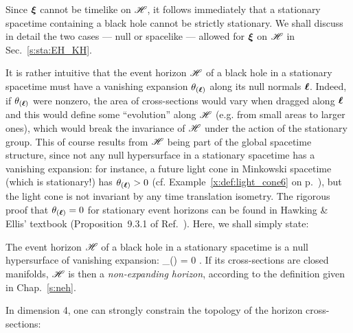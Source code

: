 Since $\bm{\xi}$ cannot be timelike on $\mathscr{H}$, it follows immediately
that a stationary spacetime containing a black hole cannot be strictly stationary.
We shall discuss in detail the two cases --- null or spacelike --- allowed
for $\bm{\xi}$ on $\mathscr{H}$ in Sec.~\ref{s:sta:EH_KH}.

It is rather intuitive that the event horizon $\mathscr{H}$ of a black hole in
a stationary spacetime must have a vanishing expansion $\theta_{(\bm{\ell})}$ along its null
normals $\bm{\ell}$. Indeed, if $\theta_{(\bm{\ell})}$ were nonzero,
the area of cross-sections would vary when dragged
along $\bm{\ell}$ and this would define some ``evolution'' along $\mathscr{H}$ (e.g. from small areas
to larger ones),
which would break the invariance of $\mathscr{H}$ under the action of the stationary group.
This of course results from $\mathscr{H}$ being part of the global spacetime structure,
since not any null hypersurface in a stationary spacetime has a vanishing
expansion: for instance, a future light cone in Minkowski spacetime
(which is stationary!) has $\theta_{(\bm{\ell})}>0$
(cf. Example~\ref{x:def:light_cone6} on p.~\pageref{x:def:light_cone6}),
but the light cone is not invariant by any time translation isometry.
The rigorous proof that $\theta_{(\bm{\ell})} = 0$
for stationary event horizons can be found in Hawking \& Ellis' textbook
(Proposition~9.3.1 of Ref.~\cite{HawkiE73}).
Here, we shall simply state:
\begin{prop}
\label{p:sta:hor_non_expanding}
The event horizon $\mathscr{H}$ of a black hole in a stationary spacetime
is a null hypersurface of vanishing expansion:
\be
    \theta_{(\wl)} = 0 .
\ee
If its cross-sections are closed manifolds, $\mathscr{H}$ is then a
\emph{non-expanding horizon},
according to the definition given in Chap.~\ref{s:neh}.
\end{prop}

In dimension 4, one can strongly constrain the topology of the horizon cross-sections:

